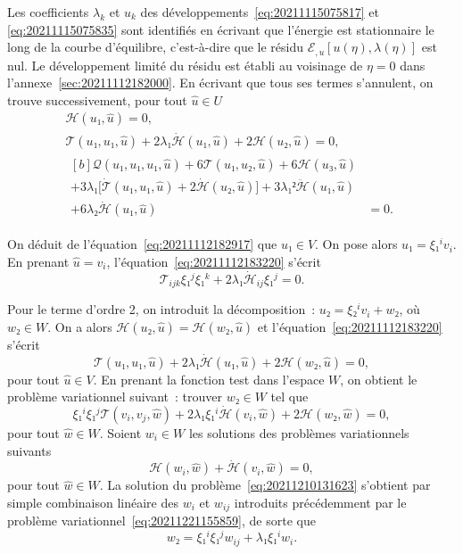 \documentclass[12pt, final]{amsart}
\begin{document}
Les coefficients \(\lambda_k\) et \(u_k\) des
développements~\eqref{eq:20211115075817} et \eqref{eq:20211115075835} sont
identifiés en écrivant que l'énergie est stationnaire le long de la courbe
d'équilibre, c'est-à-dire que le résidu
\(ℰ_{,u}[u(η), \lambda(η)]\) est nul. Le développement limité du
résidu est établi au voisinage de \(η=0\) dans
l'annexe~\ref{sec:20211112182000}. En écrivant que tous ses termes s'annulent,
on trouve successivement, pour tout \(\hat{u}∈ U\)
\begin{gather}
  \label{eq:20211112182917}
  \mathcal H(u₁, \hat{u})=0,\\
  \label{eq:20211112183220}
  \mathcal T(u₁, u₁, \hat{u})
  +2\lambda₁\dot{\mathcal H}(u₁, \hat{u})
  +2\mathcal H(u₂, \hat{u})=0,\\
  \begin{aligned}[b]
    \mathcal Q(u₁, u₁, u₁, \hat{u})
    +6\mathcal T(u₁, u₂, \hat{u})+6\mathcal H(u₃, \hat{u})&\\
    +3\lambda₁\bigl[\dot{\mathcal T}(u₁, u₁, \hat{u})
    +2\dot{\mathcal H}(u₂, \hat{u})\bigr]
    +3\lambda₁²\ddot{\mathcal H}(u₁, \hat{u})&\\
    +6\lambda₂\dot{\mathcal H}(u₁, \hat{u})&=0.
  \end{aligned}
\end{gather}

On déduit de l'équation~\eqref{eq:20211112182917} que \(u₁∈ V\). On pose
alors \(u₁=ξ₁^i v_i\). En prenant \(\hat{u}=v_i\),
l'équation~\eqref{eq:20211112183220} s'écrit
\begin{equation}
  \mathcal T_{ijk}ξ₁^jξ₁^k+2\lambda₁\dot{\mathcal H}_{ij}ξ₁^j=0.
\end{equation}

Pour le terme d'ordre 2, on introduit la décomposition~:
\(u₂=ξ₂^iv_i+w₂\), où \(w₂∈ W\). On a alors
\(\mathcal H(u₂, \hat{u})=\mathcal H(w₂, \hat{u})\) et
l'équation~\eqref{eq:20211112183220} s'écrit
\begin{equation}
  \mathcal T(u₁, u₁, \hat{u})+2\lambda₁\dot{\mathcal H}(u₁, \hat{u})
  +2\mathcal H(w₂, \hat{u})=0,
\end{equation}
pour tout \(\hat{u}∈ V\). En prenant la fonction test dans l'espace \(W\), on
obtient le problème variationnel suivant~: trouver \(w₂∈ W\) tel
que
\begin{equation}
  \label{eq:20211210131623}
  ξ₁^iξ₁^j\mathcal T(v_i, v_j, \hat{w})
  +2\lambda₁ξ₁^i\dot{\mathcal H}(v_i, \hat{w})
  +2\mathcal H(w₂, \hat{w})=0,
\end{equation}
pour tout \(\hat{w}∈ W\). Soient \(w_i∈ W\) les solutions des problèmes
variationnels suivants
\begin{equation}
  \mathcal H(w_i, \hat{w})+\dot{\mathcal H}(v_i, \hat{w})=0,
\end{equation}
pour tout \(\hat{w}∈ W\). La solution du problème~\eqref{eq:20211210131623}
s'obtient par simple combinaison linéaire des \(w_i\) et \(w_{ij}\) introduits
précédemment par le problème variationnel~\eqref{eq:20211221155859}, de sorte
que
\begin{equation}
  w₂=ξ₁^iξ₁^jw_{ij}+\lambda₁ξ₁^i w_i.
\end{equation}
\end{document}
